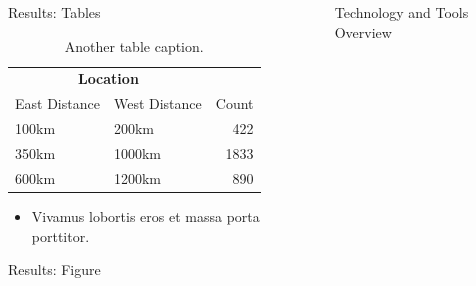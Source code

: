 \documentclass{beamer} %
\begin{document}
\begin{frame}[t]
\begin{columns}[t]
\begin{column}{0.3\textwidth}
\begin{block}{Results: Tables}
				\begin{table} %
					\caption{Another table caption.}
					\begin{tabular}{l l r}
						\toprule
						\multicolumn{2}{c}{\textbf{Location}} \\
						\cmidrule(r){1-2}
						East Distance & West Distance & Count \\
						\midrule
						100km         & 200km         & 422   \\
						350km         & 1000km        & 1833  \\
						600km         & 1200km        & 890   \\
						\bottomrule
					\end{tabular}
				\end{table}

				\bigskip\bigskip %

				\begin{itemize}
					\item Vivamus lobortis eros et massa porta porttitor.
				\end{itemize}
			\end{block}


			\begin{block}{Results: Figure}
			\end{block}


		\end{column} %

		\begin{column}{0.03\textwidth}\end{column} %

		\begin{column}{0.3\textwidth}


			\begin{block}{Technology and Tools Overview}
			\end{block}



\end{column}
\end{columns}
\end{frame}
\end{document}
